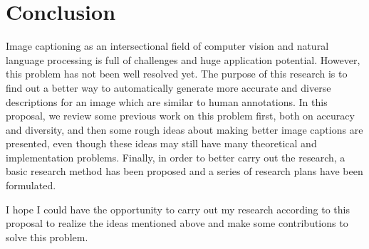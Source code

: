 \documentclass[12pt]{article}
\begin{document}
	
	
	\section{Conclusion}
	Image captioning as an intersectional field of computer vision and natural language processing is full of challenges and huge application potential. However, this problem has not been well resolved yet. The purpose of this research is to find out a better way to automatically generate more accurate and diverse descriptions for an image which are similar to human annotations. In this proposal, we review some previous work on this problem first, both on accuracy and diversity, and then some rough ideas about making better image captions are presented, even though these ideas may still have many theoretical and implementation problems. Finally, in order to better carry out the research, a basic research method has been proposed and a series of research plans have been formulated.  \par
	I hope I could have the opportunity to carry out my research according to this proposal to realize the ideas mentioned above and make some contributions to solve this problem.
	

\end{document}
